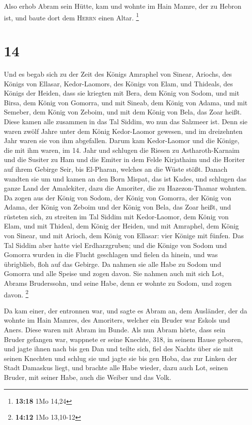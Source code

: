  Also erhob Abram sein Hütte, kam und wohnte im Hain
Mamre, der zu Hebron ist, und baute dort dem \textsc{Herrn} einen Altar.
\footnote{\textbf{13:18} 1Mo 14,24}

\hypertarget{section-3}{%
\section{14}\label{section-3}}

 Und es begab sich zu der Zeit des Königs Amraphel von
Sinear, Ariochs, des Königs von Ellasar, Kedor-Laomors, des Königs von
Elam, und Thideals, des Königs der Heiden,  dass sie
kriegten mit Bera, dem König von Sodom, und mit Birsa, dem König von
Gomorra, und mit Sineab, dem König von Adama, und mit Semeber, dem König
von Zeboim, und mit dem König von Bela, das Zoar heißt. 
Diese kamen alle zusammen in das Tal Siddim, wo nun das Salzmeer ist.
 Denn sie waren zwölf Jahre unter dem König Kedor-Laomor
gewesen, und im dreizehnten Jahr waren sie von ihm abgefallen.
 Darum kam Kedor-Laomor und die Könige, die mit ihm waren,
im 14. Jahr und schlugen die Riesen zu Astharoth-Karnaim und die Susiter
zu Ham und die Emiter in dem Felde Kirjathaim  und die
Horiter auf ihrem Gebirge Seir, bis El-Pharan, welches an die Wüste
stößt.  Danach wandten sie um und kamen an den Born
Mispat, das ist Kades, und schlugen das ganze Land der Amalekiter, dazu
die Amoriter, die zu Hazezon-Thamar wohnten.  Da zogen aus
der König von Sodom, der König von Gomorra, der König von Adama, der
König von Zeboim und der König von Bela, das Zoar heißt, und rüsteten
sich, zu streiten im Tal Siddim  mit Kedor-Laomor, dem
König von Elam, und mit Thideal, dem König der Heiden, und mit Amraphel,
dem König von Sinear, und mit Arioch, dem König von Ellasar: vier Könige
mit fünfen.  Das Tal Siddim aber hatte viel
Erdharzgruben; und die Könige von Sodom und Gomorra wurden in die Flucht
geschlagen und fielen da hinein, und was übrigblieb, floh auf das
Gebirge.  Da nahmen sie alle Habe zu Sodom und Gomorra
und alle Speise und zogen davon.  Sie nahmen auch mit
sich Lot, Abrams Bruderssohn, und seine Habe, denn er wohnte zu Sodom,
und zogen davon. \footnote{\textbf{14:12} 1Mo 13,10-12}

 Da kam einer, der entronnen war, und sagte es Abram an,
dem Ausländer, der da wohnte im Hain Mamres, des Amoriters, welcher ein
Bruder war Eskols und Aners. Diese waren mit Abram im Bunde.
 Als nun Abram hörte, dass sein Bruder gefangen war,
wappnete er seine Knechte, 318, in seinem Hause geboren, und jagte ihnen
nach bis gen Dan  und teilte sich, fiel des Nachts über
sie mit seinen Knechten und schlug sie und jagte sie bis gen Hoba, das
zur Linken der Stadt Damaskus liegt,  und brachte alle
Habe wieder, dazu auch Lot, seinen Bruder, mit seiner Habe, auch die
Weiber und das Volk.

